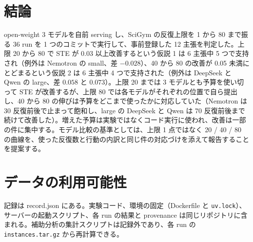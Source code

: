 \documentclass{article}
\providecommand{\airasrecordlink}[1]{#1}
\begin{document}
\section{結論}
\label{sec:conclusion}
open-weight 3 モデルを自前 serving し、SciGym の反復上限を 1 から 80 まで振る 36 run を 1 つのコミットで実行して、事前登録した 12 主張を判定した。上限 20 から 80 で STE が 0.03 以上改善するという仮説 1 は 6 主張中 5 つで支持され（例外は Nemotron の small、差 $-0.028$）、40 から 80 の改善が 0.05 未満にとどまるという仮説 2 は 6 主張中 4 つで支持された（例外は DeepSeek と Qwen の large、差 $0.058$ と $0.073$）。上限 20 までは 3 モデルとも予算を使い切って STE が改善するが、上限 80 では各モデルがそれぞれの位置で自ら提出し、40 から 80 の伸びは予算をどこまで使ったかに対応していた（Nemotron は 30 反復前後で止まって飽和し、large の DeepSeek と Qwen は 70 反復前後まで続けて改善した）。増えた予算は実験ではなくコード実行に使われ、改善は一部の件に集中する。モデル比較の基準としては、上限 1 点ではなく 20 / 40 / 80 の曲線を、使った反復数と行動の内訳と同じ件の対応づけを添えて報告することを提案する。

\section*{データの利用可能性}
記録は \airasrecordlink{record.json} にある。実験コード、環境の固定（Dockerfile と \texttt{uv.lock}）、サーバーの起動スクリプト、各 run の結果と provenance は同じリポジトリに含まれる。補助分析の集計スクリプトは記録外であり、各 run の \texttt{instances.tar.gz} から再計算できる。



\end{document}
